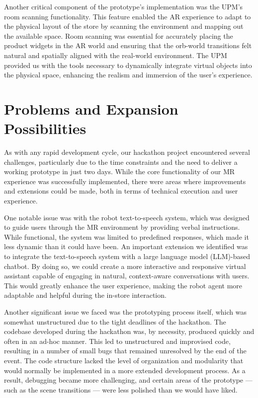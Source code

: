 \documentclass[12pt]{article}
\begin{document}
Another critical component of the prototype’s implementation was the UPM’s room scanning functionality. This feature enabled the AR experience to adapt to the physical layout of the store by scanning the environment and mapping out the available space. Room scanning was essential for accurately placing the product widgets in the AR world and ensuring that the orb-world transitions felt natural and spatially aligned with the real-world environment. The UPM provided us with the tools necessary to dynamically integrate virtual objects into the physical space, enhancing the realism and immersion of the user’s experience.

\section{Problems and Expansion Possibilities}
\label{sec:problems}

As with any rapid development cycle, our hackathon project encountered several challenges, particularly due to the time constraints and the need to deliver a working prototype in just two days. While the core functionality of our MR experience was successfully implemented, there were areas where improvements and extensions could be made, both in terms of technical execution and user experience.

One notable issue was with the robot text-to-speech system, which was designed to guide users through the MR environment by providing verbal instructions. While functional, the system was limited to predefined responses, which made it less dynamic than it could have been. An important extension we identified was to integrate the text-to-speech system with a large language model (LLM)-based chatbot. By doing so, we could create a more interactive and responsive virtual assistant capable of engaging in natural, context-aware conversations with users. This would greatly enhance the user experience, making the robot agent more adaptable and helpful during the in-store interaction.

Another significant issue we faced was the prototyping process itself, which was somewhat unstructured due to the tight deadlines of the hackathon. The codebase developed during the hackathon was, by necessity, produced quickly and often in an ad-hoc manner. This led to unstructured and improvised code, resulting in a number of small bugs that remained unresolved by the end of the event. The code structure lacked the level of organization and modularity that would normally be implemented in a more extended development process. As a result, debugging became more challenging, and certain areas of the prototype — such as the scene transitions — were less polished than we would have liked.
\end{document}
